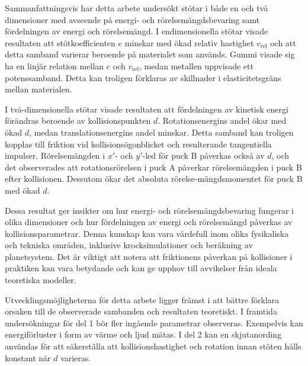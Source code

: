 Sammanfattningsvis har detta arbete undersökt stötar i både en och två dimensioner med avseende på energi- och rörelsemängdsbevaring samt fördelningen av energi och rörelsemängd. I endimensionella stötar visade resultaten att stötkoefficienten \(e\) minskar med ökad relativ hastighet \(v_{\text{rel}}\) och att detta samband varierar beroende på materialet som används. Gummi visade sig ha en linjär relation mellan \(e\) och \(v_{\text{rel}}\), medan metallen uppvisade ett potenssamband. Detta kan troligen förklaras av skillnader i elasticitetsgräns mellan materialen.

I två-dimensionella stötar visade resultaten att fördelningen av kinetisk energi förändras beroende av kollisionspunkten \(d\). Rotationsenergins andel ökar med ökad \(d\), medan translationsenergins andel minskar. Detta samband kan troligen kopplas till friktion vid kollisionsögonblicket och resulterande tangentiella impulser. Rörelsemängden i $x'$- och $y'$-led för puck B påverkas också av \(d\), och det observerades att rotationsrörelsen i puck A påverkar rörelsemängden i puck B efter kollisionen. Dessutom ökar det absoluta rörelse-mängdsmomentet för puck B med ökad \(d\).

Dessa resultat ger insikter om hur energi- och rörelsemängdsbevaring fungerar i olika dimensioner och hur fördelningen av energi och rörelsemängd påverkas av kollisionsparametrar. Denna kunskap kan vara värdefull inom olika fysikaliska och tekniska områden, inklusive krocksimulationer och beräkning av planetsystem. Det är viktigt att notera att friktionens påverkan på kollisioner i praktiken kan vara betydande och kan ge upphov till avvikelser från ideala teoretiska modeller. 

Utvecklingsmöjligheterna för detta arbete ligger främst i att bättre förklara orsaken till de observerade sambanden och resultaten teoretiskt. I framtida undersökningar för del 1 bör fler ingående parametrar observeras. Exempelvis kan energiförluster i form av värme och ljud mätas. I del 2 kan en skjutanording användas för att säkerställa att kollisionshastighet och rotation innan stöten hålls konstant när $d$ varieras.

%